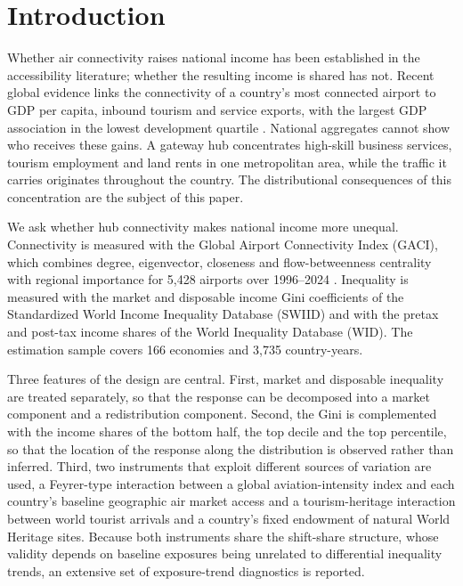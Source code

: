 \linenumbers

\section{Introduction}
\label{sec:intro}
Whether air connectivity raises national income has been established in the accessibility literature; whether the resulting income is shared has not. Recent global evidence links the connectivity of a country's most connected airport to GDP per capita, inbound tourism and service exports, with the largest GDP association in the lowest development quartile \citep{Yue_2026}. National aggregates cannot show who receives these gains. A gateway hub concentrates high-skill business services, tourism employment and land rents in one metropolitan area, while the traffic it carries originates throughout the country. The distributional consequences of this concentration are the subject of this paper.

We ask whether hub connectivity makes national income more unequal. Connectivity is measured with the Global Airport Connectivity Index (GACI), which combines degree, eigenvector, closeness and flow-betweenness centrality with regional importance for 5,428 airports over 1996--2024 \citep{Cheung_2020}. Inequality is measured with the market and disposable income Gini coefficients of the Standardized World Income Inequality Database (SWIID) and with the pretax and post-tax income shares of the World Inequality Database (WID). The estimation sample covers 166 economies and 3,735 country-years.

Three features of the design are central. First, market and disposable inequality are treated separately, so that the response can be decomposed into a market component and a redistribution component. Second, the Gini is complemented with the income shares of the bottom half, the top decile and the top percentile, so that the location of the response along the distribution is observed rather than inferred. Third, two instruments that exploit different sources of variation are used, a Feyrer-type interaction between a global aviation-intensity index and each country's baseline geographic air market access \citep{Feyrer_2019} and a tourism-heritage interaction between world tourist arrivals and a country's fixed endowment of natural World Heritage sites. Because both instruments share the shift-share structure, whose validity depends on baseline exposures being unrelated to differential inequality trends, an extensive set of exposure-trend diagnostics is reported.

